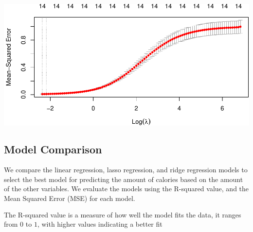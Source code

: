\documentclass[
]{article}
\newenvironment{Shaded}{\begin{snugshade}}{\end{snugshade}}
\newcommand{\AttributeTok}[1]{\textcolor[rgb]{0.13,0.29,0.53}{#1}}
\newcommand{\ConstantTok}[1]{\textcolor[rgb]{0.56,0.35,0.01}{#1}}
\newcommand{\DecValTok}[1]{\textcolor[rgb]{0.00,0.00,0.81}{#1}}
\newcommand{\FunctionTok}[1]{\textcolor[rgb]{0.13,0.29,0.53}{\textbf{#1}}}
\newcommand{\NormalTok}[1]{#1}
\newcommand{\OtherTok}[1]{\textcolor[rgb]{0.56,0.35,0.01}{#1}}
\newcommand{\SpecialCharTok}[1]{\textcolor[rgb]{0.81,0.36,0.00}{\textbf{#1}}}
\newcommand{\StringTok}[1]{\textcolor[rgb]{0.31,0.60,0.02}{#1}}
\begin{document}
\begin{Shaded}
\end{Shaded}

\begin{center}\includegraphics{Statistical_Learning_Final_Report_files/figure-latex/ridge_regression-1} \end{center}

\subsection{Model Comparison}\label{model-comparison}

We compare the linear regression, lasso regression, and ridge regression
models to select the best model for predicting the amount of calories
based on the amount of the other variables. We evaluate the models using
the R-squared value, and the Mean Squared Error (MSE) for each model.

The R-squared value is a measure of how well the model fits the data, it
ranges from \(0\) to \(1\), with higher values indicating a better fit
\end{document}
